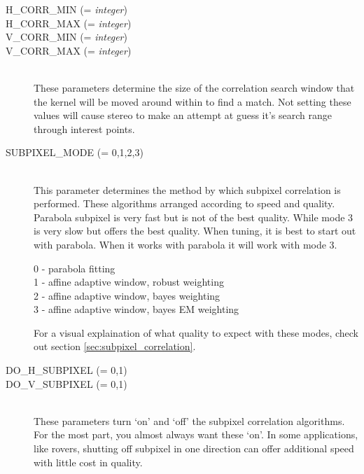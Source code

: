 \begin{description}
\item[H\_CORR\_MIN \textnormal{\small{(= \emph{integer})}}]
\item[H\_CORR\_MAX \textnormal{\small{(= \emph{integer})}}]
\item[V\_CORR\_MIN \textnormal{\small{(= \emph{integer})}}]
\item[V\_CORR\_MAX \textnormal{\small{(= \emph{integer})}}] \hfill \\

  These parameters determine the size of the correlation search window
  that the kernel will be moved around within to find a match. Not
  setting these values will cause stereo to make an attempt at guess
  it's search range through interest points.

\item[SUBPIXEL\_MODE \textnormal{\small{(= 0,1,2,3)}}] \hfill \\

  This parameter determines the method by which subpixel correlation
  is performed. These algorithms arranged according to speed and
  quality. Parabola subpixel is very fast but is not of the best
  quality. While mode 3 is very slow but offers the best quality. When
  tuning, it is best to start out with parabola. When it works with
  parabola it will work with mode 3.

  \begin{description}
    \item[0 - parabola fitting ]
    \item[1 - affine adaptive window, robust weighting ]
    \item[2 - affine adaptive window, bayes weighting ]
    \item[3 - affine adaptive window, bayes EM weighting ]
  \end{description}

  For a visual explaination of what quality to expect with these
  modes, check out section \ref{sec:subpixel_correlation}.

\item[DO\_H\_SUBPIXEL \textnormal{\small{(= 0,1)}}]
\item[DO\_V\_SUBPIXEL \textnormal{\small{(= 0,1)}}] \hfill \\

  These parameters turn `on' and `off' the subpixel correlation
  algorithms. For the most part, you almost always want these `on'. In
  some applications, like rovers, shutting off subpixel in one
  direction can offer additional speed with little cost in quality.


\end{description}
